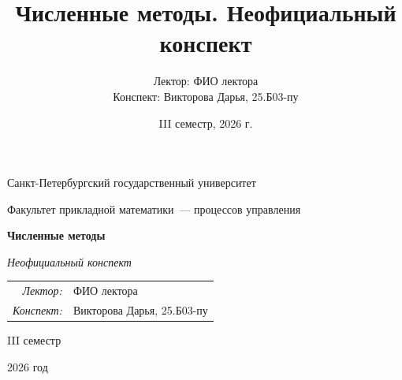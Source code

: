 \documentclass[12pt,a4paper]{report}
\title{Численные методы. Неофициальный конспект}
\author{Лектор: ФИО лектора\\
Конспект: Викторова Дарья, 25.Б03-пу}
\date{III семестр, 2026 г.}
\begin{document}
\begin{titlepage}
    \thispagestyle{empty}
    \begin{center}
        \vspace*{0.6cm}

        {\large Санкт-Петербургский государственный университет\par}
        \vspace{0.35em}
        {\normalsize Факультет прикладной математики~--- процессов управления\par}

        \vspace*{5.1cm}

        {\fontsize{30}{35}\selectfont\bfseries Численные методы\par}
        \vspace{0.65em}
        {\fontsize{17}{21}\selectfont\itshape Неофициальный конспект\par}

        \vspace{2.7cm}

        {\normalsize
        \begin{tabular}{@{}rl@{}}
            \textit{Лектор:} & ФИО лектора \\
            \textit{Конспект:} & Викторова Дарья, 25.Б03-пу
        \end{tabular}\par}

        \vfill

        {\large III семестр\par}
        \vspace{0.22em}
        {\large 2026 год\par}
        \vspace*{0.55cm}
    \end{center}
\end{titlepage}

\tableofcontents
\newpage

\setcounter{lection}{0}

\end{document}
